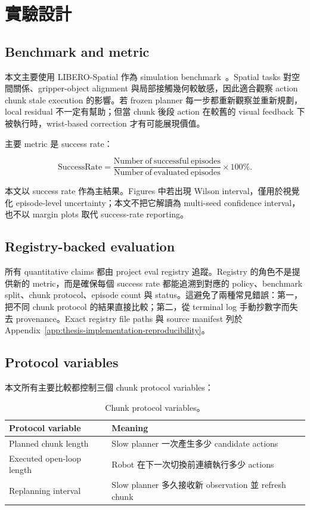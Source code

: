 \chapter{實驗設計}
\label{ch:experiments}

\section{Benchmark and metric}

本文主要使用 LIBERO-Spatial 作為 simulation benchmark~\cite{liu2023libero}。Spatial tasks 對空間關係、gripper-object alignment 與局部接觸幾何較敏感，因此適合觀察 action chunk stale execution 的影響。若 frozen planner 每一步都重新觀察並重新規劃，local residual 不一定有幫助；但當 chunk 後段 action 在較舊的 visual feedback 下被執行時，wrist-based correction 才有可能展現價值。

主要 metric 是 success rate：

\begin{equation}
  \mathrm{SuccessRate}=\frac{\mathrm{Number\ of\ successful\ episodes}}{\mathrm{Number\ of\ evaluated\ episodes}}\times100\%.
\end{equation}

本文以 success rate 作為主結果。Figures 中若出現 Wilson interval，僅用於視覺化 episode-level uncertainty；本文不把它解讀為 multi-seed confidence interval，也不以 margin plots 取代 success-rate reporting。

\section{Registry-backed evaluation}

所有 quantitative claims 都由 project eval registry 追蹤。Registry 的角色不是提供新的 metric，而是確保每個 success rate 都能追溯到對應的 policy、benchmark split、chunk protocol、episode count 與 status。這避免了兩種常見錯誤：第一，把不同 chunk protocol 的結果直接比較；第二，從 terminal log 手動抄數字而失去 provenance。Exact registry file paths 與 source manifest 列於 Appendix~\ref{app:thesis-implementation-reproducibility}。

\section{Protocol variables}

本文所有主要比較都控制三個 chunk protocol variables：

\begin{table}[htbp]
  \centering
  \caption{Chunk protocol variables。}
  \label{tab:protocol_vars}
  \begin{tabular}{ll}
    \toprule
    Protocol variable & Meaning \\
    \midrule
    Planned chunk length & Slow planner 一次產生多少 candidate actions \\
    Executed open-loop length & Robot 在下一次切換前連續執行多少 actions \\
    Replanning interval & Slow planner 多久接收新 observation 並 refresh chunk \\
    \bottomrule
  \end{tabular}
\end{table}

